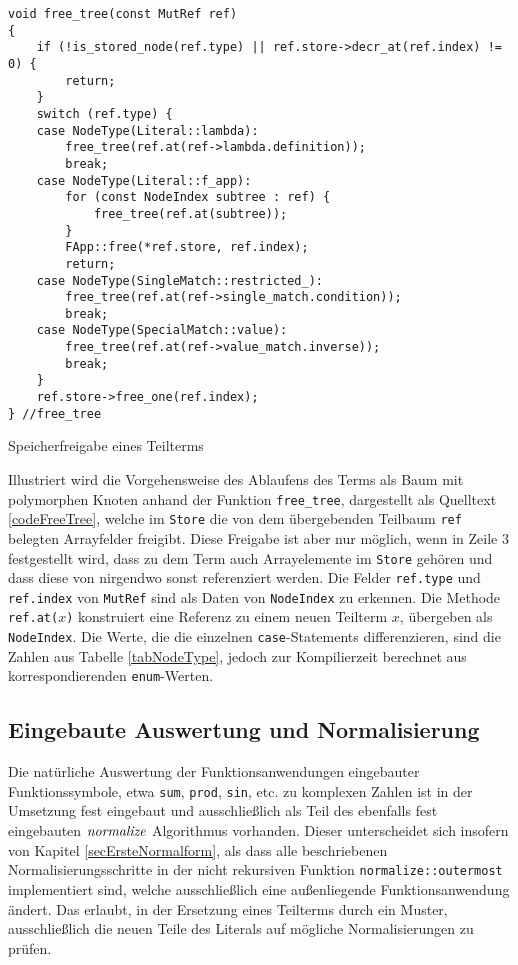 \begin{listing}
\footnotesize
\begin{verbatim}
void free_tree(const MutRef ref)
{
    if (!is_stored_node(ref.type) || ref.store->decr_at(ref.index) != 0) { 
        return; 
    }
    switch (ref.type) {
    case NodeType(Literal::lambda):
        free_tree(ref.at(ref->lambda.definition));
        break;
    case NodeType(Literal::f_app):
        for (const NodeIndex subtree : ref) {
            free_tree(ref.at(subtree));
        }
        FApp::free(*ref.store, ref.index);
        return;
    case NodeType(SingleMatch::restricted_):
        free_tree(ref.at(ref->single_match.condition));
        break;
    case NodeType(SpecialMatch::value):
        free_tree(ref.at(ref->value_match.inverse));
        break;
    }
    ref.store->free_one(ref.index);
} //free_tree
\end{verbatim}
\caption{Speicherfreigabe eines Teilterms}
\label{codeFreeTree}
\end{listing}

Illustriert wird die Vorgehensweise des Ablaufens des Terms als Baum mit polymorphen Knoten anhand der Funktion \verb|free_tree|, dargestellt als Quelltext \ref{codeFreeTree}, welche im \verb|Store| die von dem übergebenden Teilbaum \verb|ref| belegten Arrayfelder freigibt. Diese Freigabe ist aber nur möglich, wenn in Zeile 3 festgestellt wird, dass zu dem Term auch Arrayelemente im \verb|Store| gehören und dass diese von nirgendwo sonst referenziert werden.
 Die Felder \verb|ref.type| und \verb|ref.index| von \verb|MutRef| sind als Daten von \verb|NodeIndex| zu erkennen. Die Methode \verb|ref.at(|$x$\verb|)| konstruiert eine Referenz zu einem neuen Teilterm $x$, übergeben als \verb|NodeIndex|.
Die Werte, die die einzelnen \verb|case|-Statements differenzieren, sind die Zahlen aus Tabelle \ref{tabNodeType}, jedoch zur Kompilierzeit berechnet aus korrespondierenden \verb|enum|-Werten.

\subsection{Eingebaute Auswertung und Normalisierung} \label{subsubsecAuswertungNormalCpp}

Die \glqq natürliche\grqq{} Auswertung der Funktionsanwendungen eingebauter Funktionssymbole, etwa \verb|sum|, \verb|prod|, \verb|sin|, etc. zu komplexen Zahlen ist in der Umsetzung fest eingebaut und ausschließlich als Teil des ebenfalls fest eingebauten $\mathit{normalize}$ Algorithmus vorhanden. Dieser unterscheidet sich insofern von Kapitel \ref{secErsteNormalform}, als dass alle beschriebenen Normalisierungsschritte in der nicht rekursiven Funktion \verb|normalize::outermost| implementiert sind, welche ausschließlich eine außenliegende Funktionsanwendung ändert. Das erlaubt, in der Ersetzung eines Teilterms durch ein Muster, ausschließlich die neuen Teile des Literals auf mögliche Normalisierungen zu prüfen.

